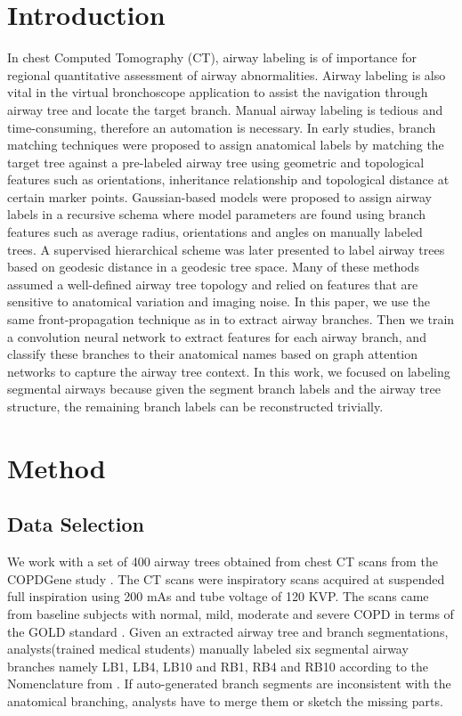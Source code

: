 \documentclass{midl} %
\begin{document}
\section{Introduction}
In chest Computed Tomography (CT), airway labeling is of importance for regional quantitative assessment of airway abnormalities. Airway labeling  is also vital in the virtual bronchoscope application to assist the navigation through airway tree and locate the target branch. Manual airway labeling is tedious and time-consuming, therefore an automation is necessary. In early studies, branch matching techniques \cite{kitaoka2002automated, tschirren2005matching, bulow2006point} were proposed to assign anatomical labels by matching the target tree against a pre-labeled airway tree using geometric and topological features such as orientations, inheritance relationship and topological distance at certain marker points.
Gaussian-based models\cite{van2008robust} were proposed to assign airway labels in a recursive schema where model parameters are found using branch features such as average radius, orientations and angles on manually labeled trees. A supervised hierarchical scheme \cite{feragen2012hierarchical} was later presented to label airway trees based on geodesic distance in a geodesic tree space. Many of these methods assumed a well-defined airway tree topology and relied on features that are sensitive to anatomical variation and imaging noise. 
In this paper, we use the same front-propagation technique as in \cite{van2008robust} to extract airway branches. Then we train a convolution neural network to extract features for each airway branch, and classify these branches to their anatomical names based on graph attention networks to capture the airway tree context. In this work, we focused on labeling segmental airways because given the segment branch labels and the airway tree structure, the remaining branch labels can be reconstructed trivially.

\section{Method}
\subsection{Data Selection}
We work with a set of 400 airway trees obtained from chest CT scans from the COPDGene study \cite{regan2011genetic}. The CT scans were inspiratory scans acquired at suspended full inspiration using 200 mAs and tube voltage of 120 KVP. The scans came from baseline subjects with normal, mild, moderate and severe COPD in terms of the GOLD standard \cite{rabe2007global}. 
Given an extracted airway tree and branch segmentations, analysts(trained medical students) manually labeled six segmental airway branches namely LB1, LB4, LB10 and RB1, RB4 and RB10 according to the Nomenclature from \cite{tschirren2005matching}. If auto-generated branch segments are inconsistent with the anatomical branching, analysts have to merge them or sketch the missing parts.
\end{document}

